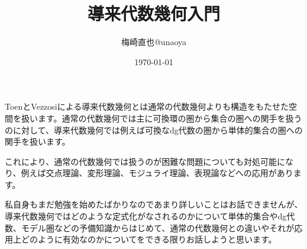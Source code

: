 \documentclass[uplatex]{jsarticle}
\title{導来代数幾何入門}
\author{梅崎直也@unaoya}
\date{\today}
\begin{document}
\maketitle
ToenとVezzosiによる導来代数幾何とは通常の代数幾何よりも構造をもたせた空間を扱います。通常の代数幾何では主に可換環の圏から集合の圏への関手を扱うのに対して、導来代数幾何では例えば可換なdg代数の圏から単体的集合の圏への関手を扱います。

これにより、通常の代数幾何では扱うのが困難な問題についても対処可能になり、例えば交点理論、変形理論、モジュライ理論、表現論などへの応用があります。

私自身もまだ勉強を始めたばかりなのであまり詳しいことはお話できませんが、導来代数幾何ではどのような定式化がなされるのかについて単体的集合やdg代数、モデル圏などの予備知識からはじめて、通常の代数幾何との違いやそれが応用上どのように有効なのかについてをできる限りお話しようと思います。
\end{document}
